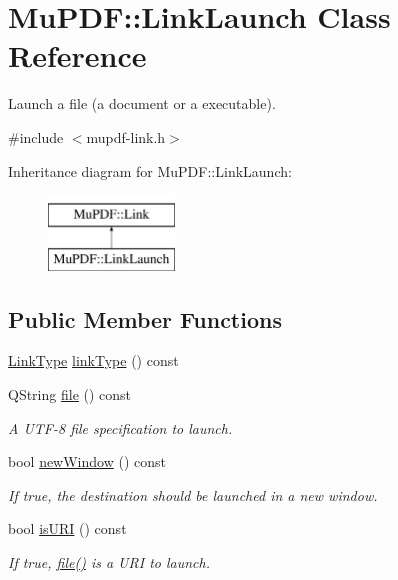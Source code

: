 \hypertarget{class_mu_p_d_f_1_1_link_launch}{\section{Mu\-P\-D\-F\-:\-:Link\-Launch Class Reference}
\label{class_mu_p_d_f_1_1_link_launch}
}


Launch a file (a document or a executable).  




{\ttfamily \#include $<$mupdf-\/link.\-h$>$}

Inheritance diagram for Mu\-P\-D\-F\-:\-:Link\-Launch\-:\begin{figure}[H]
\begin{center}
\leavevmode
\includegraphics[height=2.000000cm]{class_mu_p_d_f_1_1_link_launch}
\end{center}
\end{figure}
\subsection*{Public Member Functions}
\begin{DoxyCompactItemize}
\item 
\hyperlink{class_mu_p_d_f_1_1_link_afdc6828b6e00f323b53d6ae36d0d06b6}{Link\-Type} \hyperlink{class_mu_p_d_f_1_1_link_launch_aea60c0a000b7ce966097714e83fb68f8}{link\-Type} () const 
\item 
Q\-String \hyperlink{class_mu_p_d_f_1_1_link_launch_ac4d98cbbaa2410b69283cc3d9cbe683b}{file} () const 
\begin{DoxyCompactList}\small\item\em A U\-T\-F-\/8 file specification to launch. \end{DoxyCompactList}\item 
bool \hyperlink{class_mu_p_d_f_1_1_link_launch_a87b88518e72c8018837c18e7ff59d932}{new\-Window} () const 
\begin{DoxyCompactList}\small\item\em If true, the destination should be launched in a new window. \end{DoxyCompactList}\item 
bool \hyperlink{class_mu_p_d_f_1_1_link_launch_a21a4befd2aa791d756187df3d1dc034c}{is\-U\-R\-I} () const 
\begin{DoxyCompactList}\small\item\em If true, \hyperlink{class_mu_p_d_f_1_1_link_launch_ac4d98cbbaa2410b69283cc3d9cbe683b}{file()} is a U\-R\-I to launch. \end{DoxyCompactList}\end{DoxyCompactItemize}
